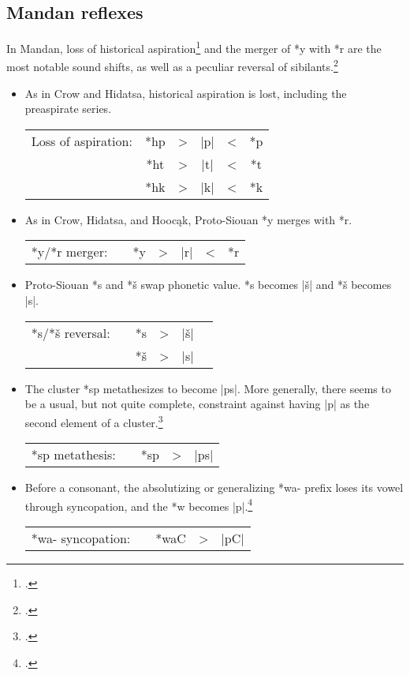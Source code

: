 \documentclass[output=paper]{LSP/langsci}
\begin{document}
\subsection{Mandan reflexes}

In Mandan, loss of historical aspiration\footnote{\citealt[50]{Rankinetal2006PDF}.} and the merger of *y with *r are the most notable sound shifts, as well as a peculiar reversal of sibilants.\footnote{\citealt[126]{Rankinetal2006PDF}.}

\begin{itemize}
\item As in Crow and Hidatsa, historical aspiration is lost, including the preaspirate series.



\begin{tabular}[t]{c c c c c c }
 Loss of aspiration: & *hp & > & |p| & < & *p \\
& *ht & >	 & |t| & < & *t \\
& *hk & > & |k| & < & *k \\
\end{tabular}

\item As in Crow, Hidatsa, and Hooc\k{a}k, Proto-Siouan *y merges with *r.


\begin{tabular}[t]{c c c c c c c}
*y/*r merger: & & *y	 & > & |r| & < & *r
\end{tabular}
\item Proto-Siouan *s and *š swap phonetic value.  *s becomes |š| and *š becomes |s|.



\begin{tabular}[t]{c c c c c c }
*s/*š reversal: & & *s & > & |š| \\
& & *š & > & |s| \\
\end{tabular}

\item The cluster *sp metathesizes to become |ps|. More generally, there seems to be a usual, but not quite complete, constraint against having |p| as the second element of a cluster.\footnote{\citealt[275]{Rankinetal2006PDF}. }


\begin{tabular}[t]{c c c c c}
*sp metathesis:	 & & *sp & > & |ps|
\end{tabular} 

\item Before a consonant, the absolutizing or generalizing *wa- prefix loses its vowel through syncopation, and the *w becomes |p|.\footnote{\citealt[793]{Rankinetal2006PDF}.}


\begin{tabular}[t]{c c c c c }
*wa- syncopation: & & *waC & > & |pC|
\end{tabular}
\end{itemize} 
\end{document}
